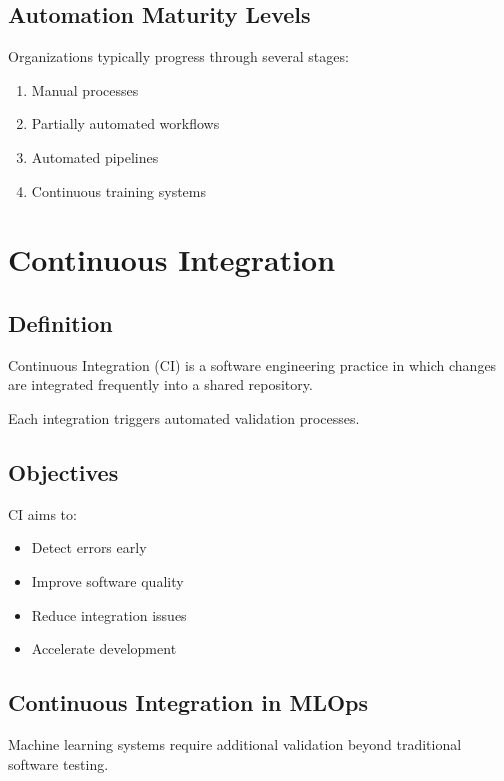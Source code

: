 \subsection{Automation Maturity Levels}

Organizations typically progress through several stages:

\begin{enumerate}
    \item Manual processes
    \item Partially automated workflows
    \item Automated pipelines
    \item Continuous training systems
\end{enumerate}

\section{Continuous Integration}

\subsection{Definition}

Continuous Integration (CI) is a software engineering practice in which changes are integrated frequently into a shared repository.

Each integration triggers automated validation processes.

\subsection{Objectives}

CI aims to:

\begin{itemize}
    \item Detect errors early
    \item Improve software quality
    \item Reduce integration issues
    \item Accelerate development
\end{itemize}

\subsection{Continuous Integration in MLOps}

Machine learning systems require additional validation beyond traditional software testing.

